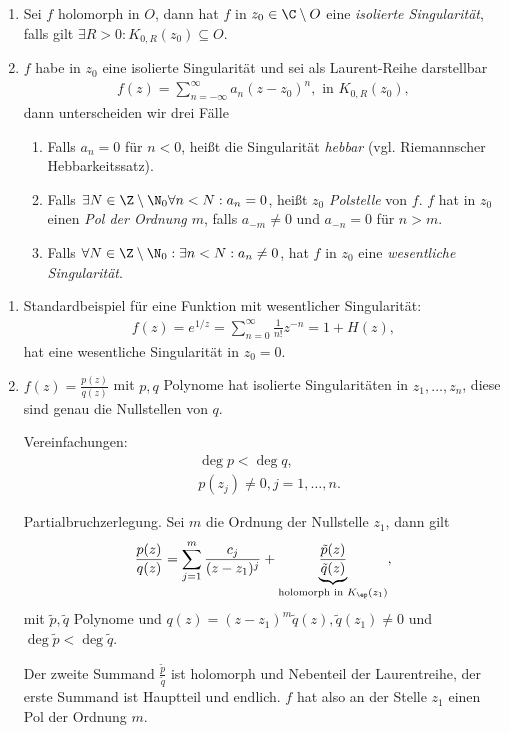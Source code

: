 \begin{defn}
\label{defn:2.82}
\begin{enumerate}[label=\arabic{*}.)]
  \item Sei $f$ holomorph in $O$, dann hat $f$ in $z_0\in \C\setminus O$ eine
  \emph{isolierte Singularität}, falls gilt $\exists R>0 :
  K_{0,R}(z_0)\subseteq O$.
  \item $f$ habe in $z_0$ eine isolierte Singularität und sei als Laurent-Reihe
  darstellbar
  \begin{align*}
  f(z) = \sum\limits_{n=-\infty}^\infty a_n (z-z_0)^{n}, \text{ in }
  K_{0,R}(z_0),
  \end{align*}
  dann unterscheiden wir drei Fälle
\begin{enumerate}[label=(\roman{*})]
  \item Falls $a_n=0$ für $n<0$,  heißt die Singularität \emph{hebbar}
  (vgl. Riemannscher Hebbarkeitssatz).
  \item Falls $\exists N\in \Z\setminus\N_0 \forall n < N : a_n = 0$,  heißt
  $z_0$ \emph{Polstelle} von $f$. $f$ hat in $z_0$ einen \emph{Pol der Ordnung $m$},
  falls $a_{-m}\neq 0$ und $a_{-n}=0$ für $n>m$.
  \item Falls $\forall N\in\Z\setminus\N_0 : \exists n< N : a_n \neq 0$,  hat
  $f$ in $z_0$ eine \emph{wesentliche Singularität}.\fishhere
\end{enumerate}
\end{enumerate}
\end{defn}

\begin{bsp}
\label{bsp:2.83}
\begin{enumerate}
  \item Standardbeispiel für eine Funktion mit wesentlicher Singularität:
  \begin{align*}
  f(z) = e^{1/z} = \sum\limits_{n=0}^\infty \frac{1}{n!}z^{-n} = 1 + H(z),
  \end{align*} 
hat eine wesentliche Singularität in $z_0 = 0$.
\item $f(z) =\frac{p(z)}{q(z)}$ mit $p,q$ Polynome hat isolierte
Singularitäten in $z_1,\ldots,z_n$, diese sind genau die Nullstellen von $q$.

Vereinfachungen:
\begin{align*}
&\deg p < \deg q,\\
&p(z_j)\neq 0, j = 1,\ldots,n.
\end{align*}

Partialbruchzerlegung. Sei $m$ die Ordnung der Nullstelle $z_1$, dann gilt
\begin{align*}
\frac{p(z)}{q(z)} = \sum\limits_{j=1}^m \frac{c_j}{(z-z_1)^j} +
\underbrace{\frac{\tilde{p}(z)}{\tilde{q}(z)}}_{\text{holomorph in }
K_\ep(z_1)},
\end{align*}
mit $\tilde{p},\tilde{q}$ Polynome und $q(z) = (z-z_1)^m\tilde{q}(z),
\tilde{q}(z_1)\neq 0$ und $\deg \tilde{p} < \deg \tilde{q}$.

Der zweite Summand $\frac{\tilde{p}}{\tilde{q}}$ ist holomorph und Nebenteil der
Laurentreihe, der erste Summand ist Hauptteil und endlich.
$f$ hat also an der Stelle $z_1$ einen Pol der Ordnung $m$.\bsphere
\end{enumerate}
\end{bsp}

